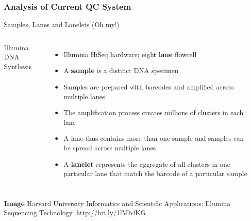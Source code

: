 \documentclass{beamer}
\begin{document}
\begin{frame}[t]
\frametitle{Analysis of Current QC System}
    \begin{beamerboxesrounded}[shadow=true]{}
        \begin{center}
            Samples, Lanes and Lanelets (Oh my!)
        \end{center}
    \end{beamerboxesrounded}

    \begin{columns}[c]
    \column{3.0cm}
        \begin{beamerboxesrounded}[shadow=true]{}
            \begin{center}
                {\tiny{Illumina DNA Synthesis}}
            \end{center}
        \end{beamerboxesrounded}
    \column{9.0cm}
        \begin{itemize}
            \item Illumina HiSeq hardware; eight \textbf{lane} flowcell
            \item A \textbf{sample} is a distinct DNA specimen
            \item Samples are prepared with barcodes and amplified across multiple lanes
            \item The amplification process creates millions of clusters in each lane
            \item A lane thus contains more than one sample and samples can be 
                spread across multiple lanes
            \item A \textbf{lanelet} represents the aggregate of all clusters 
                in one particular lane that match the barcode of a particular sample
        \end{itemize}
    \end{columns}
    \vskip 0.2cm
    {\tiny{\textbf{Image} Harvard University Informatics and Scientific Applications: 
        Illumina Sequencing Technology. http://bit.ly/1lMb4KG}}
\end{frame}
\end{document}
